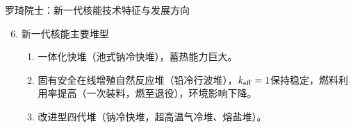 \documentclass{ctexbeamer}
\begin{document}
\begin{frame}{罗琦院士：新一代核能技术特征与发展方向}
    \begin{enumerate}\setcounter{enumi}{5}
        \item 新一代核能主要堆型
        \begin{enumerate}
            \item 一体化快堆（池式钠冷快堆），蓄热能力巨大。
            \item 固有安全在线增殖自然反应堆（铅冷行波堆），$k_{\rm eff} = 1$保持稳定，燃料利用率提高（一次装料，燃至退役），环境影响下降。
            \item 改进型四代堆（钠冷快堆，超高温气冷堆、熔盐堆）。
        \end{enumerate}
    \end{enumerate}
\end{frame}
\end{document}
